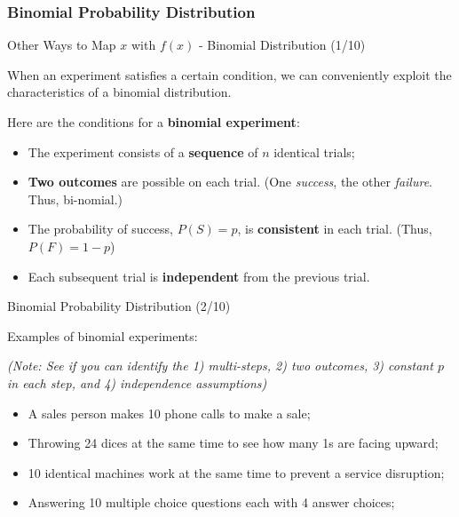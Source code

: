 \documentclass{beamer}
\begin{document}
\subsubsection{Binomial Probability Distribution}
\begin{frame}{Other Ways to Map $x$ with $f(x)$ - Binomial Distribution (1/10)}

When an experiment satisfies a certain condition, we can conveniently exploit the characteristics of a binomial distribution.

\vspace{0.3cm}
Here are the conditions for a \textbf{binomial experiment}: 
\begin{itemize}
\item The experiment consists of a \textbf{sequence} of $n$ identical trials;
\item \textbf{Two outcomes} are possible on each trial. (One \textit{success}, the other \textit{failure}. Thus, bi-nomial.)
\item The probability of success, $P(S) = p$, is \textbf{consistent} in each trial. (Thus, $P(F) = 1 - p$)
\item Each subsequent trial is \textbf{independent} from the previous trial. 
\end{itemize}

\end{frame}



\begin{frame}{Binomial Probability Distribution (2/10)}

Examples of binomial experiments:


\textit{(Note: See if you can identify the 1) multi-steps, 2) two outcomes, 3) constant $p$ in each step, and 4) independence assumptions)
}

\begin{itemize}
\item A sales person makes 10 phone calls to make a sale;
\item Throwing 24 dices at the same time to see how many 1s are facing upward; 
\item 10 identical machines work at the same time to prevent a service disruption; 
\item Answering 10 multiple choice questions each with 4 answer choices; 
\end{itemize}

\end{frame}
\end{document}

